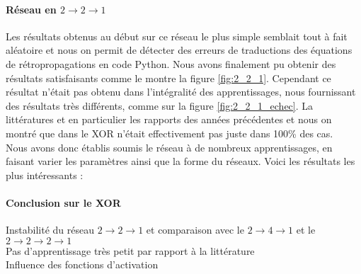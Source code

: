 \paragraph{Réseau en $2\rightarrow2\rightarrow1$} %

Les résultats obtenus au début sur ce réseau le plus simple semblait tout à fait aléatoire et nous on permit de détecter des erreurs de traductions des équations de rétropropagations en code Python. Nous avons finalement pu obtenir des résultats satisfaisants comme le montre la figure \ref{fig:2_2_1}. Cependant ce résultat n'était pas obtenu dans l'intégralité des apprentissages, nous fournissant des résultats très différents, comme sur la figure \ref{fig:2_2_1_echec}. La littératures et en particulier les rapports des années précédentes \cite{appartement} et \cite{Pinaple} nous on montré que dans le XOR n'était effectivement pas juste dans 100\% des cas.\\
Nous avons donc établis soumis le réseau à de nombreux apprentissages, en faisant varier les paramètres ainsi que la forme du réseaux. Voici les résultats les plus intéressants :


\paragraph{Conclusion sur le XOR} %
\label{par:conclusion_sur_le_xor}
Instabilité du réseau $2\rightarrow2\rightarrow1$ et comparaison avec le $ 2 \rightarrow 4 \rightarrow 1 $ et le $2 \rightarrow 2 \rightarrow 2 \rightarrow 1 $ \\
Pas d'apprentissage très petit par rapport à la littérature\\
Influence des fonctions d'activation






